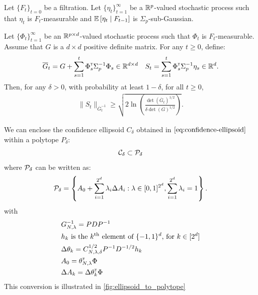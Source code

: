 \documentclass{article}
\begin{document}
\begin{proposition}
\label{prop:concentration}
Let $\{F_t\}_{t=0}$ be a filtration.
Let $\{\eta_t\}_{t=1}^\infty$ be a $\mathbb{R}^p$-valued stochastic process such that $\eta_t$ is $F_t$-measurable and $\operatorname*{\mathbb{E}}\left[\eta_t\;\middle|\; F_{t-1}\right]$ is $\Sigma_p$-sub-Gaussian.

Let $\{\Phi_t\}_{t=1}^\infty$ be an $\mathbb{R}^{p\times d}$-valued stochastic process such that $\Phi_t$ is $F_t$-measurable. Assume that $G$ is a $d\times d$ positive definite matrix. For any $t\geq 0$, define:
\begin{equation*}
    \overline{G}_t = G + \sum_{s=1}^t \Phi_s^{\mathsf{\scriptscriptstyle T}} \Sigma_p^{-1} \Phi_s \in \mathbb{R}^{d\times d} \quad S_t = \sum_{s=1}^t \Phi_s^{\mathsf{\scriptscriptstyle T}}\Sigma_p^{-1}\eta_s \in \mathbb{R}^{d}.
\end{equation*}
Then, for any $\delta>0$, with probability at least $1-\delta$, for all $t\geq0$,
\begin{align*}
\| S_t \|_{\overline{G}_t^{-1}} \geq \sqrt{2\ln \left(\frac{\det\left(\overline{G}_t\right)^{1/2}}{\delta\det(G)^{1/2}}\right)}.
\end{align*}
\end{proposition}

\begin{theorem}
\label{thm:confidence_ellipsoid}

\end{theorem}

\begin{lemma}
\label{lem:confidence_polytope}
We can enclose the confidence ellipsoid $C_\delta$ obtained in $\eqref{eq:confidence-ellipsoid}$ within a polytope $P_\delta$:
\[\mathcal{C}_\delta \subset \mathcal{P}_\delta\]
where $\mathcal{P}_\delta$ can be written as:
\begin{equation}
     \mathcal{P}_\delta = \left\{ A_{0}+\sum_{i=1}^{2^d}\lambda_{i}\Delta A_{i}: \lambda\in[0, 1]^{2^d},  \sum_{i=1}^{2^d}\lambda_{i}=1\right\}.
\end{equation}
with 
\begin{align*}
    &G_{N,\lambda}^{-1} = PDP^{-1}\\
    &h_k \text{ is the }k^\text{th}\text{ element of }\{-1,1\}^d\text{, for } k\in[2^d]\\
    &\Delta\theta_k = C_{N,\lambda,\delta}^{1/2} P^{-1}D^{-1/2} h_k \\
    &A_0 = \theta_{N,\lambda}^{\mathsf{\scriptscriptstyle T}}\Phi\\
    &\Delta A_k = \Delta\theta_k^{\mathsf{\scriptscriptstyle T}}\Phi\\
\end{align*}
This conversion is illustrated in \autoref{fig:ellipsoid_to_polytope}
\end{lemma}
\end{document}
